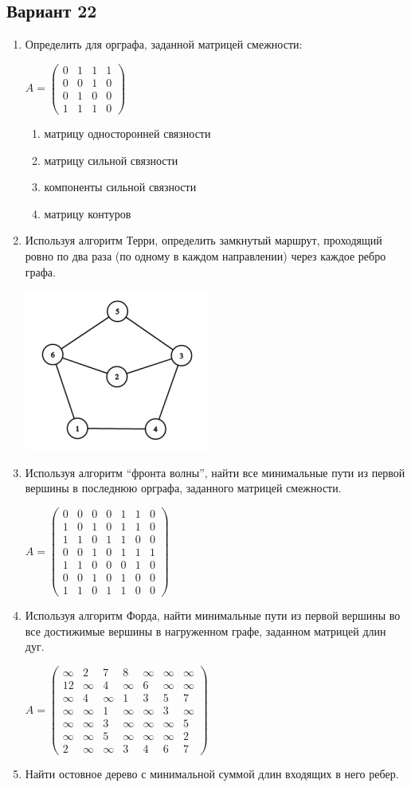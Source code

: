 \documentclass[a4paper, 12pt]{article}
\newcommand{\thAmatrix}{
    \begin{pmatrix}
        0 & 0 & 0 & 0 & 1 & 1 & 0 \\
        1 & 0 & 1 & 0 & 1 & 1 & 0 \\
        1 & 1 & 0 & 1 & 1 & 0 & 0 \\
        0 & 0 & 1 & 0 & 1 & 1 & 1 \\
        1 & 1 & 0 & 0 & 0 & 1 & 0 \\
        0 & 0 & 1 & 0 & 1 & 0 & 0 \\
        1 & 1 & 0 & 1 & 1 & 0 & 0 
    \end{pmatrix}
}
\newcommand{\fAmatrix}{
    \begin{pmatrix}
        \infty & 2 & 7 & 8 & \infty & \infty & \infty \\
        12 & \infty & 4 & \infty & 6 & \infty & \infty \\
        \infty & 4 & \infty & 1 & 3 & 5 & 7 \\
        \infty & \infty & 1 & \infty & \infty & 3 & \infty \\
        \infty & \infty & 3 & \infty & \infty & \infty & 5 \\
        \infty & \infty & 5 & \infty & \infty & \infty & 2 \\
        2 & \infty & \infty & 3 & 4 & 6 & 7 
    \end{pmatrix}
}
\begin{document}
\subsection{Вариант 22}
\begin{enumerate}
    \item Определить для орграфа, заданной матрицей смежности:
    
    $ A = \begin{pmatrix}
        0 & 1 & 1 & 1 \\
        0 & 0 & 1 & 0 \\
        0 & 1 & 0 & 0 \\
        1 & 1 & 1 & 0
    \end{pmatrix} $
    \begin{enumerate}[label=\asbuk*)]
        \item матрицу односторонней связности
        \item матрицу сильной связности
        \item компоненты сильной связности
        \item матрицу контуров
    \end{enumerate}
    \item  Используя алгоритм Терри, определить замкнутый маршрут, проходящий ровно по два раза
    (по одному в каждом направлении) через каждое ребро графа.
    
    \includegraphics{2_task}
    \item  Используя алгоритм “фронта волны”, найти все минимальные пути из первой вершины в
    последнюю орграфа, заданного матрицей смежности.
    
    $ A = \thAmatrix $
    \item Используя алгоритм Форда, найти минимальные пути из первой вершины во все
    достижимые вершины в нагруженном графе, заданном матрицей длин дуг.

    $ A = \fAmatrix $
    \item Найти остовное дерево с минимальной суммой длин входящих в него ребер. %
    

\end{enumerate}
\end{document}
